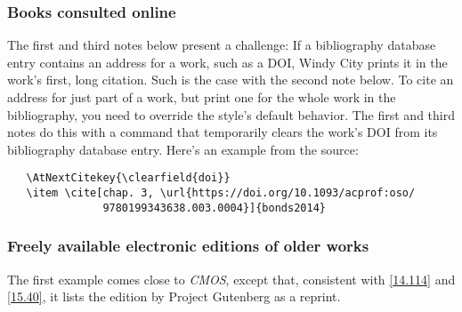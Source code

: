 \documentclass[11pt,letterpaper,oneside]{article}
\begin{document}
\setcounter{subsubsection}{160}
\subsubsection{Books consulted online}

The first and third notes below present a challenge: If a bibliography
database entry contains an address for a work, such as a DOI, Windy
City prints it in the work's first, long citation. Such is the case
with the second note below. To cite an address for just part of a
work, but print one for the whole work in the bibliography, you need
to override the style's default behavior. The first and third notes do
this with a command that temporarily clears the work's DOI from its
bibliography database entry. Here's an example from the source:

\begin{verbatim}
   \AtNextCitekey{\clearfield{doi}}
   \item \cite[chap. 3, \url{https://doi.org/10.1093/acprof:oso/
               9780199343638.003.0004}]{bonds2014}
\end{verbatim}

\begin{citebib}
\item \cite[chap. 3, \url{https://doi.org/10.1093/acprof:oso/9780199343638.003.0004}]{bonds2014}
\item \cite[59]{lystra2004}
\item \cite[chap. 11, \url{https://doi.org/10.1093/acprof:oso/9780199343638.003.0012}]{bonds2014}
\item \cite[60--61]{lystra2004}
\end{citebib}

\subsubsection{Freely available electronic editions of older works}

The first example comes close to \textit{CMOS}, except that,
consistent with \ref{14.114} and \ref{15.40}, it lists the edition by
Project Gutenberg as a reprint.

\begin{citebib}
\item \cite[bk. 6, chap. 1]{james2008}
\item \cite[1:243]{james1909}
\end{citebib}
\end{document}
